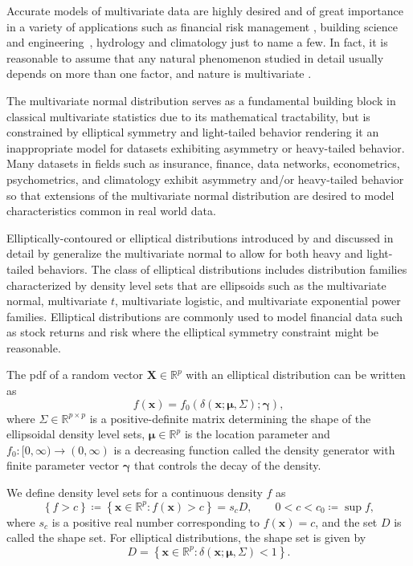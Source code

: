 \documentclass[]{article}
\newcommand{\eeq}[2][]{\begin{equation} \label{Eq:#1} #2 \end{equation}}
\newcommand{\eqq}[2][]{\begin{equation*} #2 \end{equation*}}
\numberwithin{equation}{section}
\newcommand{\de}{\delta} %
\newcommand{\fnc}[2]{#1\!\paren{#2}} %
\newcommand{\gbm}{\bm{{\gamma}}} %
\newcommand{\mub}{\bm{{\mu}}} %
\newcommand{\nf}{\infty} %
\newcommand{\paren}[1]{\left( #1 \right)} %
\newcommand{\R}{\mathbb{R}} %
\newcommand{\set}[1]{\left\{ #1 \right\}} %
\newcommand{\vecl}[1]{\mathbf{#1}}
\newcommand{\Xb}{\vecl{X}}
\newcommand{\xb}{\mathbf{x}}
\begin{document}
Accurate models of multivariate data are highly desired and of great importance in a variety of applications such as financial risk management \citep{McNeil2015}, building science and \mbox{engineering \citep{Dukhan2021, Chen2019}}, hydrology and climatology \citep{Maity2018} just to name a few. In fact, it is reasonable to assume that any natural phenomenon studied in detail usually depends on more than one factor, and nature is multivariate \mbox{\citep[Ch. 2]{Bohm2013}}.

The multivariate normal distribution serves as a fundamental building block in classical multivariate statistics due to its mathematical tractability, but is constrained by elliptical symmetry and light-tailed behavior rendering it an inappropriate model for datasets exhibiting asymmetry or heavy-tailed behavior. Many datasets in fields such as insurance, finance, data networks, econometrics, psychometrics, and climatology exhibit asymmetry and/or heavy-tailed behavior \mbox{\citep{Genton2004, Resnick2007}} so that extensions of the multivariate normal distribution are desired to model characteristics common in real world data.

Elliptically-contoured or elliptical distributions introduced by \mbox{\citet{Kelker1970}} and discussed in detail by \mbox{\citet{Fang1990}} generalize the multivariate normal to allow for both heavy and light-tailed behaviors. The class of elliptical distributions includes distribution families characterized by density level sets that are ellipsoids such as the multivariate normal, multivariate \(t\), multivariate logistic, and multivariate exponential power families. Elliptical distributions are commonly used to model financial data such as stock returns and risk \mbox{\citep{McNeil2015}} where the elliptical symmetry constraint might be reasonable.

The \ac{pdf} of a random vector \(\Xb \in \R^p\) with an elliptical distribution can be written as \eeq[elliptical-pdf]{
  \fnc{f}{\xb} = \fnc{f_0}{\fnc{\de}{\xb; \mub, \Sigma}; \gbm},
} where \mbox{$\Sigma \in \R^{p\times p}$} is a positive-definite matrix determining the shape of the ellipsoidal density level sets, \(\mub \in \R^p\) is the location parameter and \({f_0:[0, \nf)\to(0, \nf)}\) is a decreasing function called the density generator with finite parameter vector \(\gbm\) that controls the decay of the density.

We define density level sets for a continuous density \(f\) as \eeq[density-level-set]{
  \set{f > c} \coloneqq \set{\xb \in \R^p : \fnc{f}{\xb} > c} = s_c D, \qquad 0 < c < c_0 \coloneqq \sup f,
} where \(s_c\) is a positive real number corresponding to \(\fnc{f}{\xb} = c\), and the set \(D\) is called the shape set. For elliptical distributions, the shape set is given by \eqq{
  D = \set{\xb \in \R^p : \fnc{\de}{\xb; \mub, \Sigma} < 1}.
}
\end{document}
